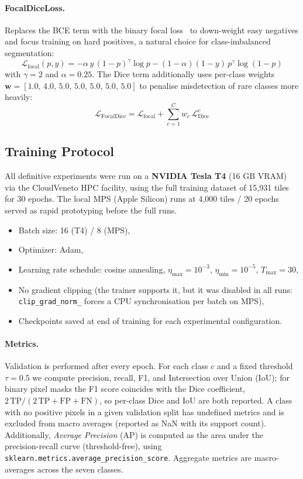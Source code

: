 \paragraph{FocalDiceLoss.}
Replaces the BCE term with the binary focal loss~\cite{lin2017focal} to down-weight easy negatives and focus training on hard positives, a natural choice for class-imbalanced segmentation:
\[
\mathcal{L}_{\text{focal}}(p,y) = -\alpha\,y\,(1-p)^\gamma \log p
                                   -(1-\alpha)(1-y)\,p^\gamma \log(1-p)
\]
with $\gamma=2$ and $\alpha=0.25$. The Dice term additionally uses per-class weights $\mathbf{w} = [1.0,\,4.0,\,5.0,\,5.0,\,5.0,\,5.0,\,5.0]$ to penalise misdetection of rare classes more heavily:
\[
\mathcal{L}_{\text{FocalDice}} = \mathcal{L}_{\text{focal}} + \sum_{c=1}^{C} w_c \,\mathcal{L}_{\text{Dice}}^c
\]

\subsection{Training Protocol}
\label{sec:mr_training}

All definitive experiments were run on a \textbf{NVIDIA Tesla T4} (16 GB VRAM) via the CloudVeneto HPC facility, using the full training dataset of 15{,}931 tiles for 30 epochs. The local MPS (Apple Silicon) runs at 4{,}000 tiles / 20 epochs served as rapid prototyping before the full runs.

\begin{itemize}
    \item Batch size: 16 (T4) / 8 (MPS),
    \item Optimizer: Adam,
    \item Learning rate schedule: cosine annealing, $\eta_{\max}=10^{-3}$, $\eta_{\min}=10^{-5}$, $T_{\max}=30$,
    \item No gradient clipping (the trainer supports it, but it was disabled in all runs: \texttt{clip\_grad\_norm\_} forces a CPU synchronisation per batch on MPS),
    \item Checkpoints saved at end of training for each experimental configuration.
\end{itemize}

\paragraph{Metrics.}
Validation is performed after every epoch. For each class $c$ and a fixed threshold $\tau=0.5$ we compute precision, recall, F1, and Intersection over Union (IoU); for binary pixel masks the F1 score coincides with the Dice coefficient, $2\,\mathrm{TP}/(2\,\mathrm{TP}+\mathrm{FP}+\mathrm{FN})$, so per-class Dice and IoU are both reported. A class with no positive pixels in a given validation split has undefined metrics and is excluded from macro averages (reported as NaN with its support count). Additionally, \textit{Average Precision} (AP) is computed as the area under the precision-recall curve (threshold-free), using \texttt{sklearn.metrics.average\_precision\_score}. Aggregate metrics are macro-averages across the seven classes.

